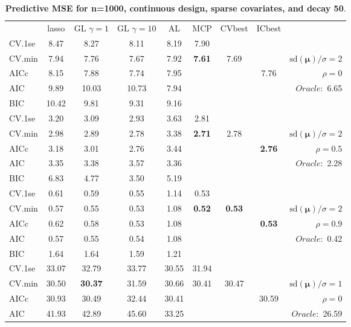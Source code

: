 \clearpage
\begin{table}\vspace{-.5cm}
\caption[l]{ { \bf Predictive MSE for n=1000, continuous design, 
sparse covariates, and  decay  50}.}
\vspace{-.5cm}
\footnotesize{}
\begin{center}
\begin{tabular}{l*{7}{c}|r}
 & lasso & GL $\gamma=1$ & GL $\gamma=10$ & AL & MCP  & CVbest & ICbest  \\
\cline{1-9}
CV.1se & 8.47 & 8.27 & 8.11 & 8.19 & 7.90 & & & \\
CV.min & 7.94 & 7.76 & 7.67 & 7.92 & {\bf 7.61} & 7.69 & & $\mathrm{sd}(\mathbf{\mu})/\sigma=2$ \\
AICc & 8.15 & 7.88 & 7.74 & 7.95 & & & 7.76 &  $\rho=0$ \\
AIC & 9.89 & 10.03 & 10.73 & 7.94 & & & &  \multirow{2}{*}{$Oracle: $ 6.65} \\
BIC & 10.42 & 9.81 & 9.31 & 9.16 & & & &  \\
 \hline 
CV.1se & 3.20 & 3.09 & 2.93 & 3.63 & 2.81 & & & \\
CV.min & 2.98 & 2.89 & 2.78 & 3.38 & {\bf 2.71} & 2.78 & & $\mathrm{sd}(\mathbf{\mu})/\sigma=2$ \\
AICc & 3.18 & 3.01 & 2.76 & 3.44 & & & {\bf 2.76} &  $\rho=0.5$ \\
AIC & 3.35 & 3.38 & 3.57 & 3.36 & & & &  \multirow{2}{*}{$Oracle: $ 2.28} \\
BIC & 6.83 & 4.77 & 3.50 & 5.19 & & & &  \\
 \hline 
CV.1se & 0.61 & 0.59 & 0.55 & 1.14 & 0.53 & & & \\
CV.min & 0.57 & 0.55 & 0.53 & 1.08 & {\bf 0.52} & {\bf 0.53} & & $\mathrm{sd}(\mathbf{\mu})/\sigma=2$ \\
AICc & 0.62 & 0.58 & 0.53 & 1.08 & & & {\bf 0.53} &  $\rho=0.9$ \\
AIC & 0.57 & 0.55 & 0.54 & 1.08 & & & &  \multirow{2}{*}{$Oracle: $ 0.42} \\
BIC & 1.64 & 1.64 & 1.59 & 1.21 & & & &  \\
 \hline 
CV.1se & 33.07 & 32.79 & 33.77 & 30.55 & 31.94 & & & \\
CV.min & 30.50 & {\bf 30.37} & 31.59 & 30.66 & 30.41 & 30.47 & & $\mathrm{sd}(\mathbf{\mu})/\sigma=1$ \\
AICc & 30.93 & 30.49 & 32.44 & 30.41 & & & 30.59 &  $\rho=0$ \\
AIC & 41.93 & 42.89 & 45.60 & 33.25 & & & &  \multirow{2}{*}{$Oracle: $ 26.59} \\

\end{tabular}
\end{center}
\end{table}
